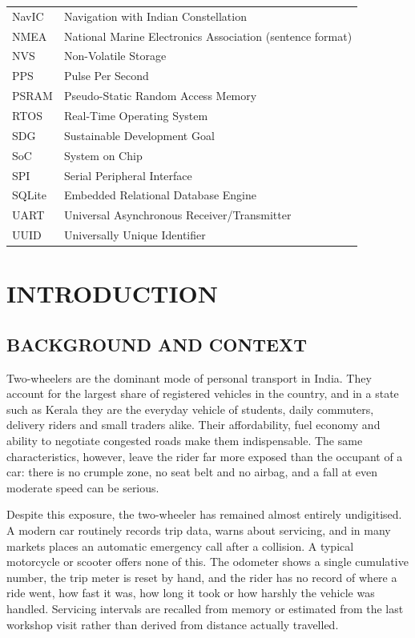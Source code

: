 \documentclass[12pt,a4paper,oneside]{report}
\begin{document}
\begin{singlespace}
\begin{tabular}{@{}p{1.15in}@{}p{4.0in}@{}}
NavIC     & Navigation with Indian Constellation\\
NMEA      & National Marine Electronics Association (sentence format)\\
NVS       & Non-Volatile Storage\\
PPS       & Pulse Per Second\\
PSRAM     & Pseudo-Static Random Access Memory\\
RTOS      & Real-Time Operating System\\
SDG       & Sustainable Development Goal\\
SoC       & System on Chip\\
SPI       & Serial Peripheral Interface\\
SQLite    & Embedded Relational Database Engine\\
UART      & Universal Asynchronous Receiver/Transmitter\\
UUID      & Universally Unique Identifier\\
\end{tabular}
\end{singlespace}
\clearpage

\setcounter{page}{1}
\chapter{INTRODUCTION}

\section{BACKGROUND AND CONTEXT}

Two-wheelers are the dominant mode of personal transport in India. They account for the
largest share of registered vehicles in the country, and in a state such as Kerala they are
the everyday vehicle of students, daily commuters, delivery riders and small traders alike.
Their affordability, fuel economy and ability to negotiate congested roads make them
indispensable. The same characteristics, however, leave the rider far more exposed than the
occupant of a car: there is no crumple zone, no seat belt and no airbag, and a fall at even
moderate speed can be serious.

Despite this exposure, the two-wheeler has remained almost entirely undigitised. A modern
car routinely records trip data, warns about servicing, and in many markets places an
automatic emergency call after a collision. A typical motorcycle or scooter offers none of
this. The odometer shows a single cumulative number, the trip meter is reset by hand, and
the rider has no record of where a ride went, how fast it was, how long it took or how
harshly the vehicle was handled. Servicing intervals are recalled from memory or estimated
from the last workshop visit rather than derived from distance actually travelled.
\end{document}
